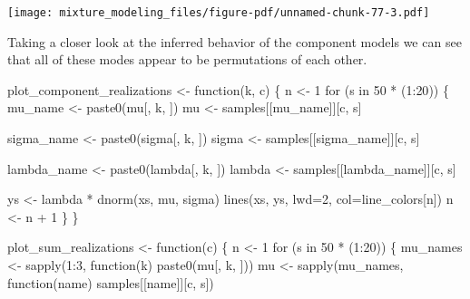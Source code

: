 \documentclass[
  letterpaper,
  DIV=11,
  numbers=noendperiod]{scrartcl}
\newenvironment{Shaded}{\begin{snugshade}}{\end{snugshade}}
\newcommand{\AttributeTok}[1]{\textcolor[rgb]{0.40,0.45,0.13}{#1}}
\newcommand{\ControlFlowTok}[1]{\textcolor[rgb]{0.00,0.23,0.31}{#1}}
\newcommand{\DecValTok}[1]{\textcolor[rgb]{0.68,0.00,0.00}{#1}}
\newcommand{\FunctionTok}[1]{\textcolor[rgb]{0.28,0.35,0.67}{#1}}
\newcommand{\NormalTok}[1]{\textcolor[rgb]{0.00,0.23,0.31}{#1}}
\newcommand{\OtherTok}[1]{\textcolor[rgb]{0.00,0.23,0.31}{#1}}
\newcommand{\SpecialCharTok}[1]{\textcolor[rgb]{0.37,0.37,0.37}{#1}}
\newcommand{\StringTok}[1]{\textcolor[rgb]{0.13,0.47,0.30}{#1}}
\begin{document}
\texttt{[image: mixture\_modeling\_files/figure-pdf/unnamed-chunk-77-3.pdf]}

Taking a closer look at the inferred behavior of the component models we
can see that all of these modes appear to be permutations of each other.

\begin{Shaded}
\begin{Highlighting}[]
\NormalTok{plot\_component\_realizations }\OtherTok{\textless{}{-}} \ControlFlowTok{function}\NormalTok{(k, c) \{}
\NormalTok{  n }\OtherTok{\textless{}{-}} \DecValTok{1}
  \ControlFlowTok{for}\NormalTok{ (s }\ControlFlowTok{in} \DecValTok{50} \SpecialCharTok{*}\NormalTok{ (}\DecValTok{1}\SpecialCharTok{:}\DecValTok{20}\NormalTok{)) \{}
\NormalTok{    mu\_name }\OtherTok{\textless{}{-}} \FunctionTok{paste0}\NormalTok{(}\StringTok{\textquotesingle{}mu[\textquotesingle{}}\NormalTok{, k, }\StringTok{\textquotesingle{}]\textquotesingle{}}\NormalTok{)}
\NormalTok{    mu }\OtherTok{\textless{}{-}}\NormalTok{ samples[[mu\_name]][c, s]}

\NormalTok{    sigma\_name }\OtherTok{\textless{}{-}} \FunctionTok{paste0}\NormalTok{(}\StringTok{\textquotesingle{}sigma[\textquotesingle{}}\NormalTok{, k, }\StringTok{\textquotesingle{}]\textquotesingle{}}\NormalTok{)}
\NormalTok{    sigma }\OtherTok{\textless{}{-}}\NormalTok{ samples[[sigma\_name]][c, s]}

\NormalTok{    lambda\_name }\OtherTok{\textless{}{-}} \FunctionTok{paste0}\NormalTok{(}\StringTok{\textquotesingle{}lambda[\textquotesingle{}}\NormalTok{, k, }\StringTok{\textquotesingle{}]\textquotesingle{}}\NormalTok{)}
\NormalTok{    lambda }\OtherTok{\textless{}{-}}\NormalTok{ samples[[lambda\_name]][c, s]}

\NormalTok{    ys }\OtherTok{\textless{}{-}}\NormalTok{ lambda }\SpecialCharTok{*} \FunctionTok{dnorm}\NormalTok{(xs, mu, sigma)}
    \FunctionTok{lines}\NormalTok{(xs, ys, }\AttributeTok{lwd=}\DecValTok{2}\NormalTok{, }\AttributeTok{col=}\NormalTok{line\_colors[n])}
\NormalTok{    n }\OtherTok{\textless{}{-}}\NormalTok{ n }\SpecialCharTok{+} \DecValTok{1}
\NormalTok{  \}}
\NormalTok{\}}

\NormalTok{plot\_sum\_realizations }\OtherTok{\textless{}{-}} \ControlFlowTok{function}\NormalTok{(c) \{}
\NormalTok{  n }\OtherTok{\textless{}{-}} \DecValTok{1}
  \ControlFlowTok{for}\NormalTok{ (s }\ControlFlowTok{in} \DecValTok{50} \SpecialCharTok{*}\NormalTok{ (}\DecValTok{1}\SpecialCharTok{:}\DecValTok{20}\NormalTok{)) \{}
\NormalTok{    mu\_names }\OtherTok{\textless{}{-}} \FunctionTok{sapply}\NormalTok{(}\DecValTok{1}\SpecialCharTok{:}\DecValTok{3}\NormalTok{, }\ControlFlowTok{function}\NormalTok{(k) }\FunctionTok{paste0}\NormalTok{(}\StringTok{\textquotesingle{}mu[\textquotesingle{}}\NormalTok{, k, }\StringTok{\textquotesingle{}]\textquotesingle{}}\NormalTok{))}
\NormalTok{    mu }\OtherTok{\textless{}{-}} \FunctionTok{sapply}\NormalTok{(mu\_names, }\ControlFlowTok{function}\NormalTok{(name) samples[[name]][c, s])}


\end{Highlighting}
\end{Shaded}
\end{document}
